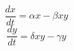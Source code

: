 \documentclass[preview]{standalone}
\begin{document}
\[\frac{dx}{dt} = \alpha x - \beta xy\]
\[\frac{dy}{dt} = \delta xy - \gamma y\]
\end{document}
